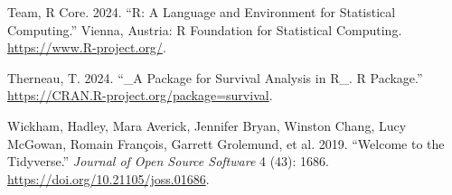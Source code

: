 \documentclass[
  letterpaper,
  DIV=11,
  numbers=noendperiod]{scrartcl}
\newlength{\cslhangindent}
\newenvironment{CSLReferences}[2] %
 {\begin{list}{}{%
  \setlength{\itemindent}{0pt}
  \setlength{\leftmargin}{0pt}
  \setlength{\parsep}{0pt}
  \ifodd #1
   \setlength{\leftmargin}{\cslhangindent}
   \setlength{\itemindent}{-1\cslhangindent}
  \fi
  \setlength{\itemsep}{#2\baselineskip}}}
 {\end{list}}
\begin{document}
\begin{CSLReferences}{1}{0}
Team, R Core. 2024. {``R: {A} {Language} and {Environment} for
{Statistical} {Computing}.''} Vienna, Austria: R Foundation for
Statistical Computing. \url{https://www.R-project.org/}.

Therneau, T. 2024. {``\_A {Package} for {Survival} {Analysis} in {R}\_.
{R} Package.''} \url{https://CRAN.R-project.org/package=survival}.

Wickham, Hadley, Mara Averick, Jennifer Bryan, Winston Chang, Lucy
McGowan, Romain François, Garrett Grolemund, et al. 2019. {``Welcome to
the {Tidyverse}.''} \emph{Journal of Open Source Software} 4 (43): 1686.
\url{https://doi.org/10.21105/joss.01686}.

\end{CSLReferences}
\end{document}
